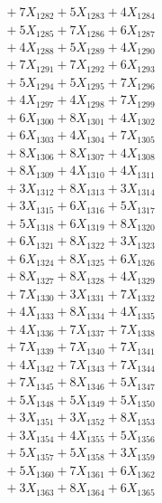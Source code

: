 \documentclass[a4paper,10pt]{article}
\begin{document}
{\begin{align}
&\;  + 7 X_{1282} + 5 X_{1283} + 4 X_{1284} \\[0.3ex]
&\;  + 5 X_{1285} + 7 X_{1286} + 6 X_{1287} \\[0.3ex]
&\;  + 4 X_{1288} + 5 X_{1289} + 4 X_{1290} \\[0.3ex]
&\;  + 7 X_{1291} + 7 X_{1292} + 6 X_{1293} \\[0.3ex]
&\;  + 5 X_{1294} + 5 X_{1295} + 7 X_{1296} \\[0.3ex]
&\;  + 4 X_{1297} + 4 X_{1298} + 7 X_{1299} \\[0.5ex]\allowbreak
&\;  + 6 X_{1300} + 8 X_{1301} + 4 X_{1302} \\[0.3ex]
&\;  + 6 X_{1303} + 4 X_{1304} + 7 X_{1305} \\[0.3ex]
&\;  + 8 X_{1306} + 8 X_{1307} + 4 X_{1308} \\[0.3ex]
&\;  + 8 X_{1309} + 4 X_{1310} + 4 X_{1311} \\[0.3ex]
&\;  + 3 X_{1312} + 8 X_{1313} + 3 X_{1314} \\[0.3ex]
&\;  + 3 X_{1315} + 6 X_{1316} + 5 X_{1317} \\[0.3ex]
&\;  + 5 X_{1318} + 6 X_{1319} + 8 X_{1320} \\[0.3ex]
&\;  + 6 X_{1321} + 8 X_{1322} + 3 X_{1323} \\[0.3ex]
&\;  + 6 X_{1324} + 8 X_{1325} + 6 X_{1326} \\[0.3ex]
&\;  + 8 X_{1327} + 8 X_{1328} + 4 X_{1329} \\[0.5ex]\allowbreak
&\;  + 7 X_{1330} + 3 X_{1331} + 7 X_{1332} \\[0.3ex]
&\;  + 4 X_{1333} + 8 X_{1334} + 4 X_{1335} \\[0.3ex]
&\;  + 4 X_{1336} + 7 X_{1337} + 7 X_{1338} \\[0.3ex]
&\;  + 7 X_{1339} + 7 X_{1340} + 7 X_{1341} \\[0.3ex]
&\;  + 4 X_{1342} + 7 X_{1343} + 7 X_{1344} \\[0.3ex]
&\;  + 7 X_{1345} + 8 X_{1346} + 5 X_{1347} \\[0.3ex]
&\;  + 5 X_{1348} + 5 X_{1349} + 5 X_{1350} \\[0.3ex]
&\;  + 3 X_{1351} + 3 X_{1352} + 8 X_{1353} \\[0.3ex]
&\;  + 3 X_{1354} + 4 X_{1355} + 5 X_{1356} \\[0.3ex]
&\;  + 5 X_{1357} + 5 X_{1358} + 3 X_{1359} \\[0.5ex]\allowbreak
&\;  + 5 X_{1360} + 7 X_{1361} + 6 X_{1362} \\[0.3ex]
&\;  + 3 X_{1363} + 8 X_{1364} + 6 X_{1365} \\[0.3ex]

\end{align}}
\end{document}
